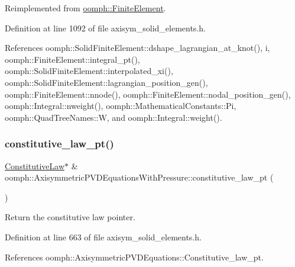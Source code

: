 Reimplemented from \hyperlink{classoomph_1_1FiniteElement_a782a540035dc31cb6ef548d9d930d8b8}{oomph\+::\+Finite\+Element}.



Definition at line 1092 of file axisym\+\_\+solid\+\_\+elements.\+h.



References oomph\+::\+Solid\+Finite\+Element\+::dshape\+\_\+lagrangian\+\_\+at\+\_\+knot(), i, oomph\+::\+Finite\+Element\+::integral\+\_\+pt(), oomph\+::\+Solid\+Finite\+Element\+::interpolated\+\_\+xi(), oomph\+::\+Solid\+Finite\+Element\+::lagrangian\+\_\+position\+\_\+gen(), oomph\+::\+Finite\+Element\+::nnode(), oomph\+::\+Finite\+Element\+::nodal\+\_\+position\+\_\+gen(), oomph\+::\+Integral\+::nweight(), oomph\+::\+Mathematical\+Constants\+::\+Pi, oomph\+::\+Quad\+Tree\+Names\+::W, and oomph\+::\+Integral\+::weight().

\mbox{\label{classoomph_1_1AxisymmetricPVDEquationsWithPressure_aa16430aa0a4158f8834a0c23fcf98cc4}} 
\subsubsection{\texorpdfstring{constitutive\+\_\+law\+\_\+pt()}{constitutive\_law\_pt()}}
{\footnotesize\ttfamily \hyperlink{classoomph_1_1ConstitutiveLaw}{Constitutive\+Law}$\ast$ \& oomph\+::\+Axisymmetric\+P\+V\+D\+Equations\+With\+Pressure\+::constitutive\+\_\+law\+\_\+pt (\begin{DoxyParamCaption}{ }\end{DoxyParamCaption})\hspace{0.3cm}{\ttfamily [inline]}}



Return the constitutive law pointer. 



Definition at line 663 of file axisym\+\_\+solid\+\_\+elements.\+h.



References oomph\+::\+Axisymmetric\+P\+V\+D\+Equations\+::\+Constitutive\+\_\+law\+\_\+pt.


